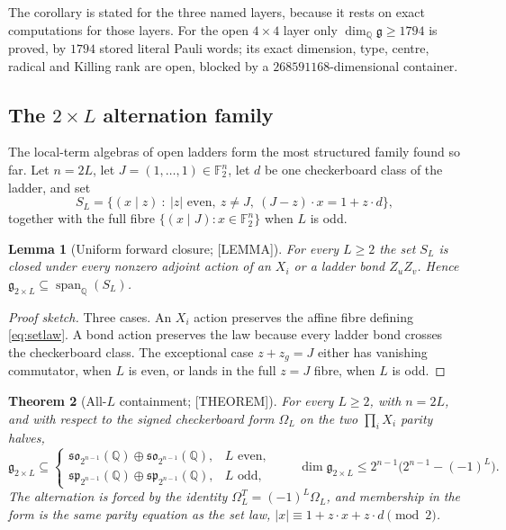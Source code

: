 \documentclass[11pt]{article}
\newtheorem{theorem}{Theorem}[section]
\newtheorem{lemma}[theorem]{Lemma}
\theoremstyle{definition}
\newcommand{\Qb}{\mathbb{Q}}
\newcommand{\Fb}{\mathbb{F}}
\newcommand{\alg}{\mathfrak{g}}
\begin{document}
The corollary is stated for the three named layers, because it rests on exact computations for those
layers. For the open $4\times4$ layer only $\dim_\Qb\alg\ge1794$ is proved, by $1794$ stored literal
Pauli words; its exact dimension, type, centre, radical and Killing rank are open, blocked by a
$268591168$-dimensional container.

\subsection{The $2\times L$ alternation family}\label{sec:altern}
The local-term algebras of open ladders form the most structured family found so far. Let $n=2L$,
let $J=(1,\dots,1)\in\Fb_2^n$, let $d$ be one checkerboard class of the ladder, and set
\begin{equation}
S_L=\bigl\{(x\mid z)\ :\ |z|\text{ even},\ z\ne J,\ (J-z)\cdot x=1+z\cdot d\bigr\},
\label{eq:setlaw}
\end{equation}
together with the full fibre $\{(x\mid J):x\in\Fb_2^n\}$ when $L$ is odd.

\begin{lemma}[Uniform forward closure; {[LEMMA]}]\label{lem:closure}
For every $L\ge2$ the set $S_L$ is closed under every nonzero adjoint action of an $X_i$ or a ladder
bond $Z_uZ_v$. Hence $\alg_{2\times L}\subseteq\operatorname{span}_\Qb(S_L)$.
\end{lemma}

\begin{proof}[Proof sketch]
Three cases. An $X_i$ action preserves the affine fibre defining \eqref{eq:setlaw}. A bond action
preserves the law because every ladder bond crosses the checkerboard class. The exceptional case
$z+z_g=J$ either has vanishing commutator, when $L$ is even, or lands in the full $z=J$ fibre, when
$L$ is odd.
\end{proof}

\begin{theorem}[All-$L$ containment; {[THEOREM]}]\label{thm:containment}
For every $L\ge2$, with $n=2L$, and with respect to the signed checkerboard form $\Omega_L$ on the
two $\prod_iX_i$ parity halves,
\[
\alg_{2\times L}\subseteq
\begin{cases}
\mathfrak{so}_{2^{n-1}}(\Qb)\oplus\mathfrak{so}_{2^{n-1}}(\Qb), & L\text{ even},\\[2pt]
\mathfrak{sp}_{2^{n-1}}(\Qb)\oplus\mathfrak{sp}_{2^{n-1}}(\Qb), & L\text{ odd},
\end{cases}
\qquad
\dim\alg_{2\times L}\le 2^{n-1}\bigl(2^{n-1}-(-1)^L\bigr).
\]
The alternation is forced by the identity $\Omega_L^{T}=(-1)^L\Omega_L$, and membership in the form
is the same parity equation as the set law, $|x|\equiv1+z\cdot x+z\cdot d \pmod 2$.
\end{theorem}
\end{document}
